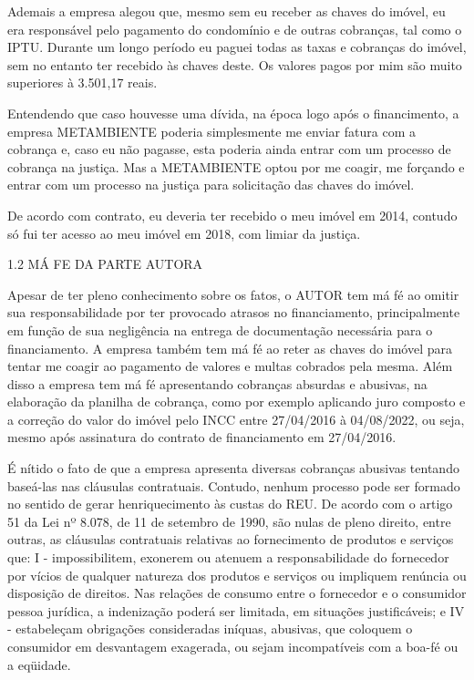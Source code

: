 \documentclass[11pt]{letter}
\begin{document}
Ademais a empresa alegou que, mesmo sem eu receber as chaves do imóvel, eu era responsável pelo pagamento do condomínio e de outras cobranças, tal como o IPTU. Durante um longo período eu paguei todas as taxas e cobranças do imóvel, sem no entanto ter recebido às chaves deste. Os valores pagos por mim são muito superiores à 3.501,17 reais.

Entendendo que caso houvesse uma dívida, na época logo após o financimento, a empresa METAMBIENTE poderia simplesmente me enviar fatura com a cobrança e, caso eu não pagasse, esta poderia ainda entrar com um processo de cobrança na justiça. Mas a METAMBIENTE optou por me coagir, me forçando e entrar com um processo na justiça para solicitação das chaves do imóvel.

De acordo com contrato, eu deveria ter recebido o meu imóvel em 2014, contudo só fui ter acesso ao meu imóvel em 2018, com limiar da justiça. 

1.2 MÁ FE DA PARTE AUTORA

Apesar de ter pleno conhecimento sobre os fatos, o AUTOR tem má fé ao omitir sua responsabilidade por ter provocado atrasos no financiamento, principalmente em função de sua negligência na entrega de documentação necessária para o financiamento. A empresa também tem má fé ao reter as chaves do imóvel para tentar me coagir ao pagamento de valores e multas cobrados pela mesma. Além disso a empresa tem má fé apresentando cobranças absurdas e abusivas, na elaboração da planilha de cobrança, como por exemplo aplicando juro composto e a correção do valor do imóvel pelo INCC entre 27/04/2016 à 04/08/2022, ou seja, mesmo após assinatura do contrato de financiamento em 27/04/2016.

É nítido o fato de que a empresa apresenta diversas cobranças abusivas tentando baseá-las nas cláusulas contratuais. Contudo, nenhum processo pode ser formado no sentido de gerar henriquecimento às custas do REU. De acordo com o artigo 51 da Lei nº 8.078, de 11 de setembro de 1990, são nulas de pleno direito, entre outras, as cláusulas contratuais relativas ao fornecimento de produtos e serviços que: I - impossibilitem, exonerem ou atenuem a responsabilidade do fornecedor por vícios de qualquer natureza dos produtos e serviços ou impliquem renúncia ou disposição de direitos. Nas relações de consumo entre o fornecedor e o consumidor pessoa jurídica, a indenização poderá ser limitada, em situações justificáveis; e IV - estabeleçam obrigações consideradas iníquas, abusivas, que coloquem o consumidor em desvantagem exagerada, ou sejam incompatíveis com a boa-fé ou a eqüidade. 
\end{document}
